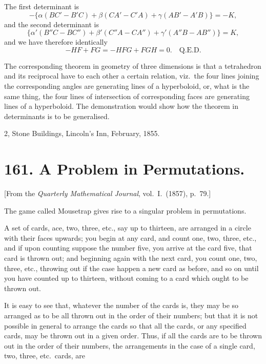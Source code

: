 \documentclass[12pt,a4paper]{article}
\theoremstyle{plain}
\begin{document}
The first determinant is
\[
-\{\alpha(BC' - B'C) + \beta(CA' - C'A) + \gamma(AB' - A'B)\} = -K,
\]
and the second determinant is
\[
\{\alpha'(B''C - BC'') + \beta'(C''A - CA'') + \gamma'(A''B - AB'')\} = K,
\]
and we have therefore identically
\[
-HF + FG = -HFG + FGH = 0. \quad \text{Q.E.D.}
\]

The corresponding theorem in geometry of three dimensions is that a tetrahedron and its reciprocal have to each other a certain relation, viz.\ the four lines joining the corresponding angles are generating lines of a hyperboloid, or, what is the same thing, the four lines of intersection of corresponding faces are generating lines of a hyperboloid. The demonstration would show how the theorem in determinants is to be generalised.

\begin{flushright}
2, Stone Buildings, Lincoln's Inn, February, 1855.
\end{flushright}

\clearpage

\section*{161. A Problem in Permutations.}

[From the \textit{Quarterly Mathematical Journal}, vol.~I.\ (1857), p.~79.]

The game called Mousetrap gives rise to a singular problem in permutations.

A set of cards, ace, two, three, etc., say up to thirteen, are arranged in a circle with their faces upwards; you begin at any card, and count one, two, three, etc., and if upon counting suppose the number five, you arrive at the card five, that card is thrown out; and beginning again with the next card, you count one, two, three, etc., throwing out if the case happen a new card as before, and so on until you have counted up to thirteen, without coming to a card which ought to be thrown out.

It is easy to see that, whatever the number of the cards is, they may be so arranged as to be all thrown out in the order of their numbers; but that it is not possible in general to arrange the cards so that all the cards, or any specified cards, may be thrown out in a given order. Thus, if all the cards are to be thrown out in the order of their numbers, the arrangements in the case of a single card, two, three, etc.\ cards, are
\end{document}

